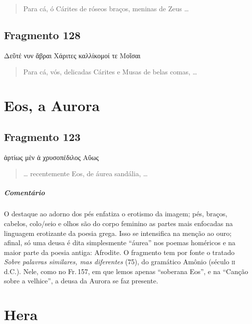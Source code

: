 \begin{verse}
Para cá, ó Cárites de róseos braços, meninas de Zeus \ldots{}
\end{verse}\bigskip


\section{Fragmento 128} 

\begin{gkverse}
Δεῦτέ νυν ἄβραι Χάριτες καλλίκομοί τε Μοῖσαι
\end{gkverse}

\begin{verse}
Para cá, vós, delicadas Cárites e Musas de belas comas, \ldots{}
\end{verse}


\chapter{Eos, a Aurora}

\section{Fragmento 123}

\begin{gkverse}
ἀρτίως μὲν ἀ χρυσοπέδιλος Αὔως
\end{gkverse}

\begin{verse}
\ldots{} recentemente Eos, de áurea sandália, \ldots{}
\end{verse}

{\paragraph{Comentário} O destaque ao adorno dos pés enfatiza o erotismo da imagem; pés, braços,
cabelos, colo/seio e olhos são do corpo feminino as partes mais enfocadas na
linguagem erotizante da poesia grega. Isso se intensifica na menção ao ouro;
afinal, só uma deusa é dita simplesmente ``áurea” nos poemas homéricos
e na maior parte da poesia antiga: Afrodite. O fragmento tem por fonte o
tratado \textit{Sobre palavras similares, mas diferentes} (75), do gramático Amônio
(século \textsc{ii} d.C.).
Nele, como no Fr.\,157, em que lemos apenas ``soberana Eos'', e na ``Canção sobre a velhice'', a deusa da Aurora se faz presente.}



\chapter{Hera}

